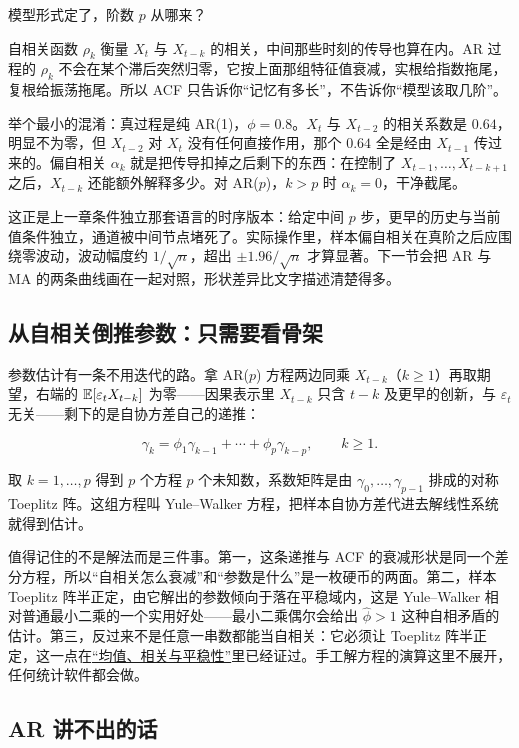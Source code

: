 模型形式定了，阶数 \(p\) 从哪来？

自相关函数 \(\rho_k\) 衡量 \(X_t\) 与 \(X_{t-k}\) 的相关，中间那些时刻的传导也算在内。AR 过程的 \(\rho_k\) 不会在某个滞后突然归零，它按上面那组特征值衰减，实根给指数拖尾，复根给振荡拖尾。所以 ACF 只告诉你``记忆有多长''，不告诉你``模型该取几阶''。

举个最小的混淆：真过程是纯 AR(1)，\(\phi=0.8\)。\(X_t\) 与 \(X_{t-2}\) 的相关系数是 \(0.64\)，明显不为零，但 \(X_{t-2}\) 对 \(X_t\) 没有任何直接作用，那个 \(0.64\) 全是经由 \(X_{t-1}\) 传过来的。偏自相关 \(\alpha_k\) 就是把传导扣掉之后剩下的东西：在控制了 \(X_{t-1},\ldots,X_{t-k+1}\) 之后，\(X_{t-k}\) 还能额外解释多少。对 AR(\(p\))，\(k>p\) 时 \(\alpha_k=0\)，干净截尾。

这正是上一章条件独立那套语言的时序版本：给定中间 \(p\) 步，更早的历史与当前值条件独立，通道被中间节点堵死了。实际操作里，样本偏自相关在真阶之后应围绕零波动，波动幅度约 \(1/\sqrt{n}\)，超出 \(\pm1.96/\sqrt{n}\) 才算显著。下一节会把 AR 与 MA 的两条曲线画在一起对照，形状差异比文字描述清楚得多。

\subsection{从自相关倒推参数：只需要看骨架}

参数估计有一条不用迭代的路。拿 AR(\(p\)) 方程两边同乘 \(X_{t-k}\)（\(k\ge1\)）再取期望，右端的 \(\mathbb{E}[\varepsilon_tX_{t-k}]\) 为零——因果表示里 \(X_{t-k}\) 只含 \(t-k\) 及更早的创新，与 \(\varepsilon_t\) 无关——剩下的是自协方差自己的递推：

\[
\gamma_k=\phi_1\gamma_{k-1}+\cdots+\phi_p\gamma_{k-p},\qquad k\ge1.
\]

取 \(k=1,\ldots,p\) 得到 \(p\) 个方程 \(p\) 个未知数，系数矩阵是由 \(\gamma_0,\ldots,\gamma_{p-1}\) 排成的对称 Toeplitz 阵。这组方程叫 Yule--Walker 方程，把样本自协方差代进去解线性系统就得到估计。

值得记住的不是解法而是三件事。第一，这条递推与 ACF 的衰减形状是同一个差分方程，所以``自相关怎么衰减''和``参数是什么''是一枚硬币的两面。第二，样本 Toeplitz 阵半正定，由它解出的参数倾向于落在平稳域内，这是 Yule--Walker 相对普通最小二乘的一个实用好处——最小二乘偶尔会给出 \(\hat\phi>1\) 这种自相矛盾的估计。第三，反过来不是任意一串数都能当自相关：它必须让 Toeplitz 阵半正定，这一点在\hyperref[sec:06-Random-Processes/01-Foundations/03]{``均值、相关与平稳性''}里已经证过。手工解方程的演算这里不展开，任何统计软件都会做。

\subsection{AR 讲不出的话}

